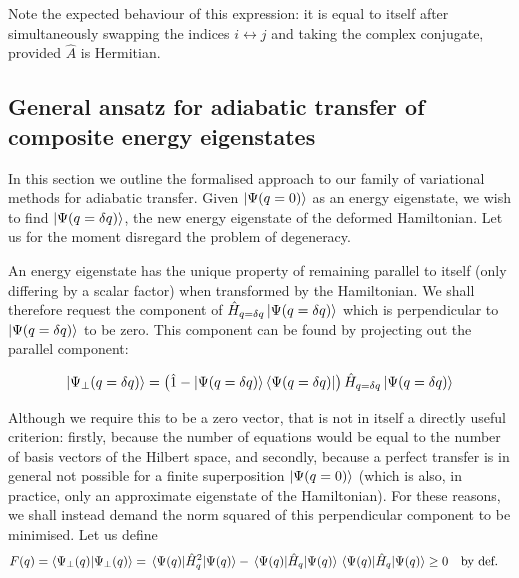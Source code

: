 \documentclass[12pt]{article}
\begin{document}
	Note the expected behaviour of this expression: it is equal to itself after simultaneously swapping the indices $i \leftrightarrow j$ and taking the complex conjugate, provided $\hat{A}$ is Hermitian.
	
	\subsection{General ansatz for adiabatic transfer of composite energy eigenstates}
	
	In this section we outline the formalised approach to our family of variational methods for adiabatic transfer. Given $\ket{\Psi(q = 0)}$ as an energy eigenstate, we wish to find $\ket{\Psi(q = \delta q)}$, the new energy eigenstate of the deformed Hamiltonian. Let us for the moment disregard the problem of degeneracy.
	
	An energy eigenstate has the unique property of remaining parallel to itself (only differing by a scalar factor) when transformed by the Hamiltonian. We shall therefore request the component of $\hat{H}_{q = \delta q}\ket{\Psi(q = \delta q)}$ which is perpendicular to $\ket{\Psi(q = \delta q)}$ to be zero. This component can be found by projecting out the parallel component:
	
	\begin{equation}
	\ket{\Psi_\perp(q = \delta q)} = \left(\hat{1} - \ket{\Psi(q = \delta q)}\bra{\Psi(q = \delta q)}\right) \hat{H}_{q = \delta q} \ket{\Psi(q = \delta q)}
	\end{equation}
	
	Although we require this to be a zero vector, that is not in itself a directly useful criterion: firstly, because the number of equations would be equal to the number of basis vectors of the Hilbert space, and secondly, because a perfect transfer is in general not possible for a finite superposition $\ket{\Psi(q = 0)}$ (which is also, in practice, only an approximate eigenstate of the Hamiltonian). For these reasons, we shall instead demand the norm squared of this perpendicular component to be minimised. Let us define
	\begin{equation}
	F(q) = \braket{\Psi_\perp(q)}{\Psi_\perp(q)} = \mel{\Psi(q)}{\hat{H}_{q}^2}{\Psi(q)} - \mel{\Psi(q)}{\hat{H}_{q}}{\Psi(q)}\mel{\Psi(q)}{\hat{H}_{q}}{\Psi(q)} \geq 0 \qq{by def.}
	\end{equation}
	
\end{document}
